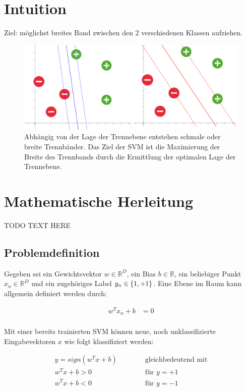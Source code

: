 \documentclass[a4paper,11pt,twoside]{scrreprt}
\begin{document}
\section{Intuition}
Ziel: möglichst breites Band zwischen den 2 verschiedenen Klassen aufziehen.


\begin{figure}[H]
	\centering
	\includegraphics[width = 16cm]{assets/small_vs_big_margin.png}
	\caption{Abhängig von der Lage der Trennebene entstehen schmale oder breite Trennbänder. Das Ziel der \ac{SVM} ist die Maximierung der Breite des Trennbands durch die Ermittlung der optimalen Lage der Trennebene.}
	\label{fig:intuition_margin}
\end{figure}


\section{Mathematische Herleitung}

TODO TEXT HERE
\subsection{Problemdefinition}
Gegeben sei ein Gewichtsvektor $w \in \mathbb{R}^{D}$, ein Bias $b \in \mathbb{R}$, ein beliebiger Punkt $x_{n} \in \mathbb{R}^{D}$ und ein zugehöriges Label $y_{n} \in \{\-1, +1\}$. Eine Ebene im Raum kann allgemein definiert werden durch:

\begin{equation} \label{plane_eq}
    \begin{aligned}
    w^{T} x_{n} + b &= 0 \\
    \end{aligned}
\end{equation}

Mit einer bereits trainierten \ac{SVM} können neue, noch unklassifizierte Eingabevektoren $x$ wie folgt klassifiziert werden:

\begin{subequations} \label{svm_classify1}
	\begin{alignat}{2}
		y = sign(w^{T} x + b)  & \qquad & \text{ gleichbedeutend mit} \\
		w^{T} x + b > 0 & & \text{ für } y = +1\\
		w^{T} x + b < 0 & & \text{ für } y = -1
	\end{alignat}
\end{subequations}
\end{document}

